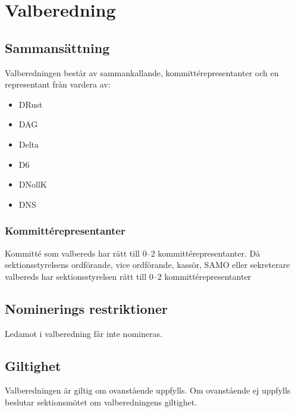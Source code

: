 \section{Valberedning}
\subsection{Sammansättning}
Valberedningen består av sammankallande, kommittérepresentanter och en representant från vardera av:
\begin{itemize}
  \item DRust
  \item DAG 
  \item Delta 
  \item D6 
  \item DNollK
  \item DNS
\end{itemize}

\subsubsection{Kommittérepresentanter}
  Kommitté som valbereds har rätt till 0--2 kommittérepresentanter. Då sektionsstyrelsens ordförande, vice ordförande, kassör, SAMO eller sekreterare valbereds har sektionsstyrelsen rätt till 0--2 kommittérepresentanter 

  \subsection{Nominerings restriktioner}
Ledamot i valberedning får inte nomineras.

\subsection{Giltighet}
Valberedningen är giltig om ovanstående uppfylls. Om ovanstående ej uppfylls beslutar sektionsmötet om valberedningens giltighet.
